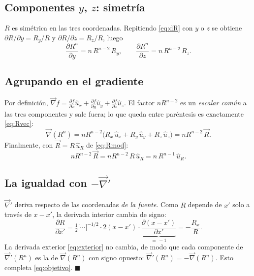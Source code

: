 \documentclass[11pt,a4paper]{article}
\numberwithin{equation}{section}
\newcommand{\vc}[1]{\vec{#1}}
\newcommand{\nab}{\vec{\nabla}}
\newcommand{\pd}[2]{\frac{\partial #1}{\partial #2}}
\newcommand{\ux}{\hat u_x}
\newcommand{\uy}{\hat u_y}
\newcommand{\uz}{\hat u_z}
\newcommand{\uR}{\hat u_R}
\begin{document}
\subsection{Componentes $y$, $z$: simetría}
$R$ es simétrica en las tres coordenadas. Repitiendo \eqref{eq:dR} con $y$ o
$z$ se obtiene $\partial R/\partial y=R_y/R$ y $\partial R/\partial z=R_z/R$,
luego
\begin{equation}\label{eq:compyz}
  \pd{R^{n}}{y}=n\,R^{n-2}\,R_y,\qquad \pd{R^{n}}{z}=n\,R^{n-2}\,R_z .
\end{equation}

\subsection{Agrupando en el gradiente}
Por definición, $\nab f=\pd{f}{x}\ux+\pd{f}{y}\uy+\pd{f}{z}\uz$. El factor
$nR^{n-2}$ es un \emph{escalar común} a las tres componentes y sale fuera; lo
que queda entre paréntesis es exactamente \eqref{eq:Rvec}:
\begin{equation}\label{eq:agrupar}
  \nab(R^{n})=nR^{n-2}\bigl(R_x\,\ux+R_y\,\uy+R_z\,\uz\bigr)
  =nR^{n-2}\,\vc{R}.
\end{equation}
Finalmente, con $\vc{R}=R\,\uR$ de \eqref{eq:Rmod}:
\begin{equation}\label{eq:final}
  nR^{n-2}\,\vc{R}=nR^{n-2}\,R\,\uR=n\,R^{n-1}\,\uR .
\end{equation}

\subsection{La igualdad con $-\nab'$}
$\nab'$ deriva respecto de las coordenadas \emph{de la fuente}. Como $R$
depende de $x'$ solo a través de $x-x'$, la derivada interior cambia de signo:
\begin{equation}\label{eq:dRprima}
  \pd{R}{x'}=\tfrac12\bigl[\cdots\bigr]^{-1/2}\cdot2(x-x')\cdot
  \underbrace{\pd{(x-x')}{x'}}_{=\,-1}=-\frac{R_x}{R}.
\end{equation}
La derivada exterior \eqref{eq:exterior} no cambia, de modo que cada
componente de $\nab'(R^{n})$ es la de $\nab(R^{n})$ con signo opuesto:
$\nab'(R^{n})=-\nab(R^{n})$. Esto completa \eqref{eq:objetivo}.
\hfill$\blacksquare$

\end{document}
